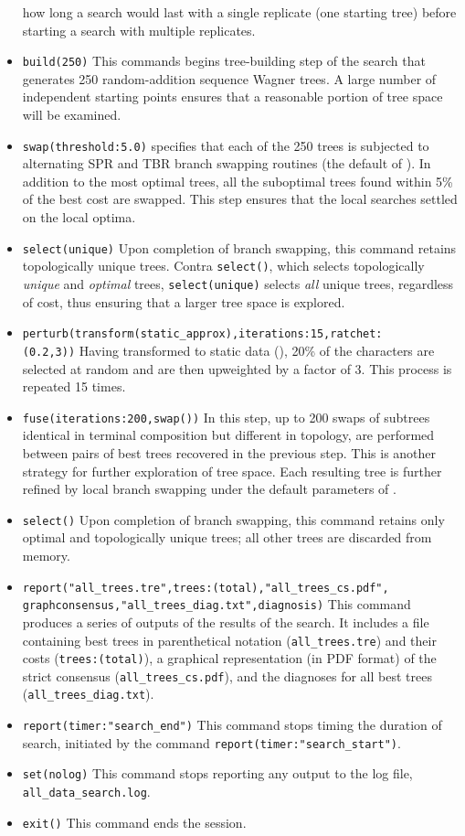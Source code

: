 \begin{itemize}
how long a search would last with a single replicate (one starting tree) before starting a search with multiple 
replicates.
\item \texttt{build(250)} This commands begins tree-building step of the search that generates 250 
random-addition sequence Wagner trees. A large number of independent starting points ensures that a reasonable portion of tree 
space will be examined.
\item \texttt{swap(threshold:5.0)}  specifies that each of the 250 trees is subjected to 
alternating SPR and TBR branch swapping routines (the default of \poy). 
In addition to the most optimal trees, all the suboptimal trees found within 5\% of the best cost are swapped.
 This step ensures that the local searches settled on the local optima.
\item \texttt{select(unique)} Upon completion of branch swapping, this command retains topologically unique trees.
Contra \texttt{select()}, which selects topologically \emph{unique} and \emph{optimal} trees,  \texttt{select(unique)} 
selects \emph{all} unique trees, regardless of cost, thus ensuring that a larger tree space is explored.
\item \texttt{perturb(transform(static\_approx),iterations:15,ratchet:\\(0.2,3))} Having transformed to static data 
(), 20\% of the characters are selected at random and are then upweighted by 
a factor of $3$.  This process is repeated 15 times.
\item \texttt{fuse(iterations:200,swap())} In this step, up to 200 swaps of subtrees identical in terminal 
composition but different in topology, are performed between pairs of best trees recovered in the previous 
step. This is another strategy for further exploration of tree space. Each resulting tree is further refined by 
local branch swapping under the default parameters of .
\item \texttt{select()} Upon completion of branch swapping, this command retains only optimal and 
topologically unique trees; all other trees are discarded from memory.
\item \texttt{report("all\_trees.tre",trees:(total),"all\_trees\_cs.pdf",\\ graphconsensus,"all\_trees\_diag.txt",diagnosis)} This command 
produces a series of outputs of the results of the search. It includes a file containing best trees in parenthetical 
notation (\texttt{all\_trees.tre}) and their costs (\texttt{trees:(total)}), a graphical representation (in PDF format) of the strict consensus 
(\texttt{all\_trees\_cs.pdf}), and the diagnoses for all best trees (\texttt{all\_trees\_diag.txt}).
\item \texttt{report(timer:"search\_end")} This command stops timing the duration of search, initiated by the 
command \texttt{report(timer:"search\_start")}.
\item \texttt{set(nolog)} This command stops reporting any output to the log file, \texttt{all\_data\_search.log}.
\item \texttt{exit()} This command ends the \poy session.
\end{itemize}

